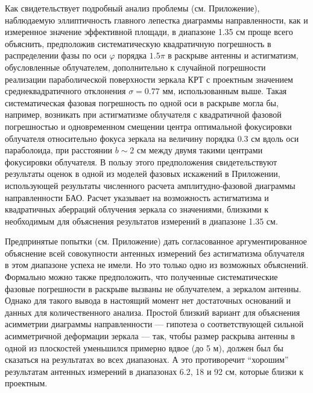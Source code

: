 Как свидетельствует подробный анализ проблемы (см. Приложение),
наблюдаемую эллиптичность главного лепестка диаграммы направленности,
как и измеренное значение эффективной площади, в диапазоне 1.35 см
проще всего объяснить, предположив систематическую квадратичную погрешность
в распределении фазы по оси $\varphi$ порядка $1.5 \pi$ в раскрыве
антенны и астигматизм, обусловленные облучателем, дополнительно к случайной
погрешности реализации параболической поверхности зеркала КРТ с проектным
значением среднеквадратичного отклонения $\sigma = 0.77$ мм, использованным выше.
Такая систематическая фазовая погрешность по одной оси в раскрыве могла бы,
например, возникать при астигматизме облучателя с квадратичной фазовой
погрешностью и одновременном смещении центра оптимальной фокусировки облучателя
относительно фокуса зеркала на величину порядка 0.3 см вдоль оси параболоида,
при расстоянии $b \sim 2$ см между двумя такими центрами фокусировки облучателя.
В пользу этого предположения свидетельствуют результаты оценок в одной из
моделей фазовых искажений в Приложении, использующей результаты численного
расчета \cite{}  амплитудно-фазовой диаграммы направленности БАО.
Расчет \cite{} указывает на возможность астигматизма и квадратичных
аберраций облучения зеркала со значениями, близкими к необходимым для объяснения
результатов измерений в диапазоне 1.35 см.

Предпринятые попытки (см. Приложение) дать согласованное
аргументированное объяснение всей совокупности антенных измерений без
астигматизма облучателя в этом диапазоне успеха не имели.
Но это только одно из возможных объяснений.
Формально можно также предположить, что полученные систематические фазовые погрешности в раскрыве
вызваны не облучателем, а зеркалом антенны.
Однако для такого вывода в настоящий момент нет достаточных оснований
и данных для количественного анализа. Простой близкий вариант для объяснения асимметрии диаграммы
направленности --- гипотеза о соответствующей сильной асимметричной деформации зеркала --- так,
чтобы размер раскрыва антенны
в одной из плоскостей уменьшился примерно вдвое (до 5 м), должен был бы сказаться на результатах во
всех диапазонах. А это противоречит ``хорошим'' результатам антенных измерений в диапазонах 6.2, 18
и 92 см, которые близки к проектным.




